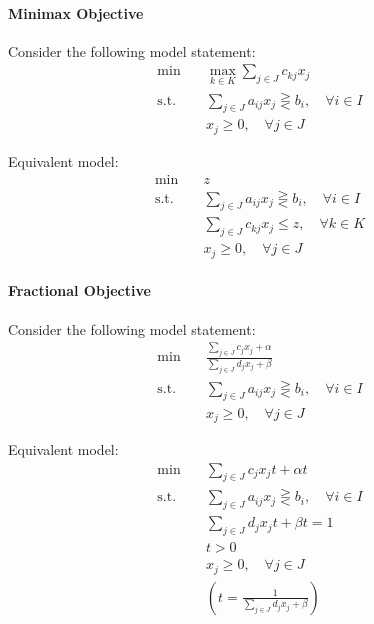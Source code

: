         \paragraph{Minimax Objective}
            
            Consider the following model statement:
            \begin{align*}
                \min \quad & \max_{k\in K}\sum_{j\in J}c_{kj}x_j \\
                \text{s.t.} \quad & \sum_{j\in J}a_{ij}x_j \gtreqless b_i, \quad \forall i\in I \\
                                  & x_j \ge 0, \quad \forall j\in J 
            \end{align*}
            
            Equivalent model:
            \begin{align*}
                \min \quad & z \\
                \text{s.t.} \quad & \sum_{j\in J}a_{ij}x_j \gtreqless b_i, \quad \forall i\in I \\
                                  & \sum_{j\in J}c_{kj}x_j \le z, \quad \forall k\in K \\
                                  & x_j \ge 0, \quad \forall j\in J 
            \end{align*}
        \paragraph{Fractional Objective}
            
            Consider the following model statement:
            \begin{align*}
                \min \quad & \frac{\sum_{j\in J}c_{j}x_j + \alpha}{\sum_{j\in J}d_{j}x_j + \beta} \\
                \text{s.t.} \quad & \sum_{j\in J}a_{ij}x_j \gtreqless b_i, \quad \forall i\in I \\
                                  & x_j \ge 0, \quad \forall j\in J 
            \end{align*}
            
            Equivalent model:
            \begin{align*}
                \min \quad & \sum_{j\in J}c_{j}x_jt + \alpha t \\
                \text{s.t.} \quad & \sum_{j\in J}a_{ij}x_j \gtreqless b_i, \quad \forall i\in I \\
                                  & \sum_{j\in J}d_jx_jt + \beta t = 1\\
                                  & t > 0 \\
                                  & x_j \ge 0, \quad \forall j\in J \\
                                  & (t = \frac1{\sum_{j\in J}d_jx_j + \beta})
            \end{align*}
